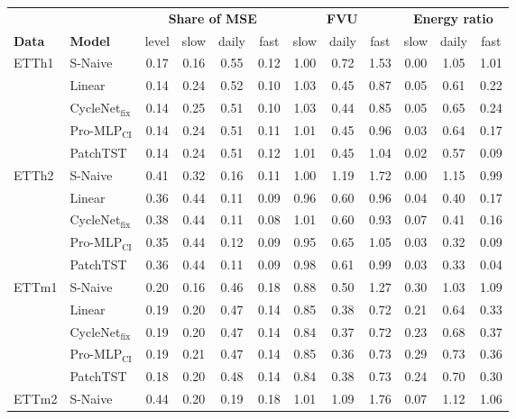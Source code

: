 \begin{tabular}{llcccccccccc}
\toprule
& & \multicolumn{4}{c}{\textbf{Share of MSE}} & \multicolumn{3}{c}{\textbf{FVU}} & \multicolumn{3}{c}{\textbf{Energy ratio}} \\
\cmidrule(lr){3-6} \cmidrule(lr){7-9} \cmidrule(lr){10-12}
\textbf{Data} & \textbf{Model} & level & slow & daily & fast & slow & daily & fast & slow & daily & fast \\
\midrule
\multirow{5}{*}{ETTh1} & S-Naive & 0.17 & 0.16 & 0.55 & 0.12 & 1.00 & 0.72 & 1.53 & 0.00 & 1.05 & 1.01 \\
 & Linear & 0.14 & 0.24 & 0.52 & 0.10 & 1.03 & 0.45 & 0.87 & 0.05 & 0.61 & 0.22 \\
 & CycleNet$_{\text{fix}}$ & 0.14 & 0.25 & 0.51 & 0.10 & 1.03 & 0.44 & 0.85 & 0.05 & 0.65 & 0.24 \\
 & Pro-MLP$_{\text{CI}}$ & 0.14 & 0.24 & 0.51 & 0.11 & 1.01 & 0.45 & 0.96 & 0.03 & 0.64 & 0.17 \\
 & PatchTST & 0.14 & 0.24 & 0.51 & 0.12 & 1.01 & 0.45 & 1.04 & 0.02 & 0.57 & 0.09 \\
\midrule
\multirow{5}{*}{ETTh2} & S-Naive & 0.41 & 0.32 & 0.16 & 0.11 & 1.00 & 1.19 & 1.72 & 0.00 & 1.15 & 0.99 \\
 & Linear & 0.36 & 0.44 & 0.11 & 0.09 & 0.96 & 0.60 & 0.96 & 0.04 & 0.40 & 0.17 \\
 & CycleNet$_{\text{fix}}$ & 0.38 & 0.44 & 0.11 & 0.08 & 1.01 & 0.60 & 0.93 & 0.07 & 0.41 & 0.16 \\
 & Pro-MLP$_{\text{CI}}$ & 0.35 & 0.44 & 0.12 & 0.09 & 0.95 & 0.65 & 1.05 & 0.03 & 0.32 & 0.09 \\
 & PatchTST & 0.36 & 0.44 & 0.11 & 0.09 & 0.98 & 0.61 & 0.99 & 0.03 & 0.33 & 0.04 \\
\midrule
\multirow{5}{*}{ETTm1} & S-Naive & 0.20 & 0.16 & 0.46 & 0.18 & 0.88 & 0.50 & 1.27 & 0.30 & 1.03 & 1.09 \\
 & Linear & 0.19 & 0.20 & 0.47 & 0.14 & 0.85 & 0.38 & 0.72 & 0.21 & 0.64 & 0.33 \\
 & CycleNet$_{\text{fix}}$ & 0.19 & 0.20 & 0.47 & 0.14 & 0.84 & 0.37 & 0.72 & 0.23 & 0.68 & 0.37 \\
 & Pro-MLP$_{\text{CI}}$ & 0.19 & 0.21 & 0.47 & 0.14 & 0.85 & 0.36 & 0.73 & 0.29 & 0.73 & 0.36 \\
 & PatchTST & 0.18 & 0.20 & 0.48 & 0.14 & 0.84 & 0.38 & 0.73 & 0.24 & 0.70 & 0.30 \\
\midrule
\multirow{5}{*}{ETTm2} & S-Naive & 0.44 & 0.20 & 0.19 & 0.18 & 1.01 & 1.09 & 1.76 & 0.07 & 1.12 & 1.06 \\

\end{tabular}
